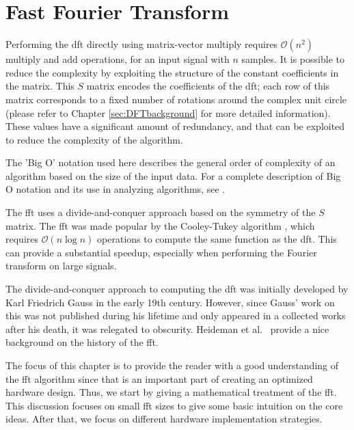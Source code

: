 
\chapter{Fast Fourier Transform}
\glsresetall
\label{chapter:fft}

Performing the \gls{dft} directly using matrix-vector multiply requires $\mathcal{O}(n^2)$ multiply and add operations, for an input signal with $n$ samples.  It is possible to reduce the complexity by exploiting the structure of the constant coefficients in the matrix.  This $S$ matrix encodes the coefficients of the \gls{dft}; each row of this matrix corresponds to a fixed number of rotations around the complex unit circle (please refer to Chapter \ref{sec:DFTbackground} for more detailed information). These values have a significant amount of redundancy, and that can be exploited to reduce the complexity of the algorithm. 

\begin{aside}
The 'Big O' notation used here describes the general order of complexity of an algorithm based on the size of the input data.  For a complete description of Big O notation and its use in analyzing algorithms, see \cite{CLR}.
\end{aside}

The \gls{fft} uses a divide-and-conquer approach based on the symmetry of the $S$ matrix.  The \gls{fft} was made popular by the Cooley-Tukey algorithm \cite{cooley65}, which requires $\mathcal{O}(n \log n)$ operations to compute the same function as the \gls{dft}.  This can provide a substantial speedup, especially when performing the Fourier transform on large signals. %

\begin{aside}
The divide-and-conquer approach to computing the \gls{dft} was initially developed by Karl Friedrich Gauss in the early 19th century. However, since Gauss' work on this was not published during his lifetime and only appeared in a collected works after his death, it was relegated to obscurity.  Heideman et al.~\cite{heideman84} provide a nice background on the history of the \gls{fft}.
\end{aside}

The focus of this chapter is to provide the reader with a good understanding of the \gls{fft} algorithm since that is an important part of creating an optimized hardware design. Thus, we start by giving a mathematical treatment of the \gls{fft}. This discussion focuses on small \gls{fft} sizes to give some basic intuition on the core ideas. After that, we focus on different hardware implementation strategies.

